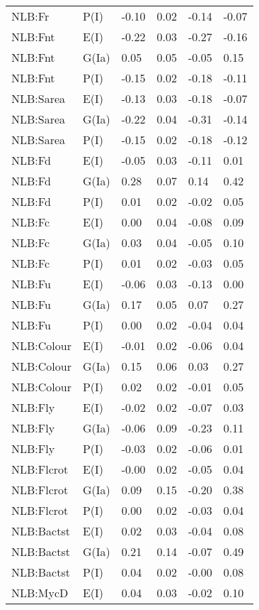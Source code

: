 \begin{center}
\begin{longtable}{|p{1.1in}|p{0.7in}|p{0.7in}|p{0.6in}|p{0.6in}|p{0.6in}|}
  NLB:Fr & P(I) & -0.10 & 0.02 & -0.14 & -0.07 \\ 
  NLB:Fnt & E(I) & -0.22 & 0.03 & -0.27 & -0.16 \\ 
  NLB:Fnt & G(Ia) & 0.05 & 0.05 & -0.05 & 0.15 \\ 
  NLB:Fnt & P(I) & -0.15 & 0.02 & -0.18 & -0.11 \\ 
  NLB:Sarea & E(I) & -0.13 & 0.03 & -0.18 & -0.07 \\ 
  NLB:Sarea & G(Ia) & -0.22 & 0.04 & -0.31 & -0.14 \\ 
  NLB:Sarea & P(I) & -0.15 & 0.02 & -0.18 & -0.12 \\ 
  NLB:Fd & E(I) & -0.05 & 0.03 & -0.11 & 0.01 \\ 
  NLB:Fd & G(Ia) & 0.28 & 0.07 & 0.14 & 0.42 \\ 
  NLB:Fd & P(I) & 0.01 & 0.02 & -0.02 & 0.05 \\ 
  NLB:Fc & E(I) & 0.00 & 0.04 & -0.08 & 0.09 \\ 
  NLB:Fc & G(Ia) & 0.03 & 0.04 & -0.05 & 0.10 \\ 
  NLB:Fc & P(I) & 0.01 & 0.02 & -0.03 & 0.05 \\ 
  NLB:Fu & E(I) & -0.06 & 0.03 & -0.13 & 0.00 \\ 
  NLB:Fu & G(Ia) & 0.17 & 0.05 & 0.07 & 0.27 \\ 
  NLB:Fu & P(I) & 0.00 & 0.02 & -0.04 & 0.04 \\ 
  NLB:Colour & E(I) & -0.01 & 0.02 & -0.06 & 0.04 \\ 
  NLB:Colour & G(Ia) & 0.15 & 0.06 & 0.03 & 0.27 \\ 
  NLB:Colour & P(I) & 0.02 & 0.02 & -0.01 & 0.05 \\ 
  NLB:Fly & E(I) & -0.02 & 0.02 & -0.07 & 0.03 \\ 
  NLB:Fly & G(Ia) & -0.06 & 0.09 & -0.23 & 0.11 \\ 
  NLB:Fly & P(I) & -0.03 & 0.02 & -0.06 & 0.01 \\ 
  NLB:Flcrot & E(I) & -0.00 & 0.02 & -0.05 & 0.04 \\ 
  NLB:Flcrot & G(Ia) & 0.09 & 0.15 & -0.20 & 0.38 \\ 
  NLB:Flcrot & P(I) & 0.00 & 0.02 & -0.03 & 0.04 \\ 
  NLB:Bactst & E(I) & 0.02 & 0.03 & -0.04 & 0.08 \\ 
  NLB:Bactst & G(Ia) & 0.21 & 0.14 & -0.07 & 0.49 \\ 
  NLB:Bactst & P(I) & 0.04 & 0.02 & -0.00 & 0.08 \\ 
  NLB:MycD & E(I) & 0.04 & 0.03 & -0.02 & 0.10 \\ 

\end{longtable}
\end{center}
